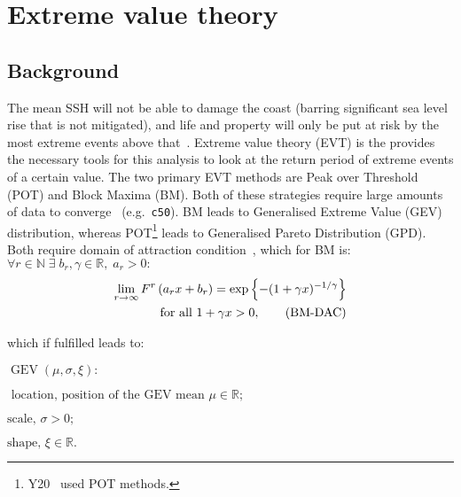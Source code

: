 \section{Extreme value theory}
\label{sec:evt}
\subsection{Background}
The mean SSH will
not be able to damage the coast
(barring significant sea level rise that is not mitigated),
and life and property will only be put
at risk by the most extreme events above that~\cite{taleb2019statistical, Taleb2012AntifragileH}.
Extreme value theory (EVT) is the provides the necessary tools for this analysis
to look at the return period of extreme events of a certain value.
The two primary EVT methods are Peak over Threshold (POT) and Block Maxima (BM).
Both of these strategies require
large amounts of data to converge~\cite{taleb2019much} (e.g.~\texttt{c50}).
BM leads to Generalised Extreme Value (GEV) distribution,
whereas POT\footnote{Y20~\cite{ZannaPreprint} used POT methods. }
leads to Generalised Pareto Distribution (GPD).
Both require domain of attraction condition~\cite{bucher2018horse}, which
for BM is:
$\forall r \in \mathbb{N} \;\exists \;b_r, \gamma\in \mathbb{R},\; a_r>0: $
    \begin{align}
    \lim _{r \rightarrow \infty} F^{r}\left(a_{r} x+b_{r}\right)=\exp \left\{-(1+\gamma x)^{-1 / \gamma}\right\} \notag \\
     \text { for all } 1+\gamma x>0,
    \tag{BM-DAC}
    \end{align}

which if fulfilled leads to:


    \(
    \operatorname{GEV}(\mu, \sigma, \xi):
    \)

    \(
    \text{ location, position of the GEV mean } \mu \in \mathbb{R};
    \)

    \(
    \text{scale, } \sigma>0;
    \)

    \(
    \text{shape, } \xi \in \mathbb{R}.
    \)

